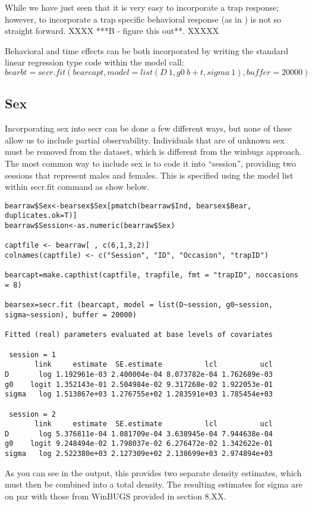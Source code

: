 While we have just seen that 
it is very easy to incorporate a trap response; however, to
incorporate a trap specific behavioral response (as in
\citet{royle_etal:2009}) is not so straight forward.  XXXX ***B - figure
this out**. XXXXX

Behavioral and time effects can be both incorporated by writing the standard linear regression type code within the model call:
\[
bearbt=secr.fit (bearcapt, model = list(D~1, g0~b + t, sigma~1), buffer = 20000)
\]

\subsection{Sex}

Incorporating sex into secr can be done a few different ways, but none
of these allow us to include partial observability.   Individuals that
are of unknown sex must be removed from the dataset, which is
different from the winbugs approach.  The most common way to include
sex is to code it into ``session'', providing two sessions that
represent males and females.  This is specified using the model list
within secr.fit command as show below.
{\small 
\begin{verbatim}
bearraw$Sex<-bearsex$Sex[pmatch(bearraw$Ind, bearsex$Bear, duplicates.ok=T)]
bearraw$Session<-as.numeric(bearraw$Sex)

captfile <- bearraw[ , c(6,1,3,2)] 
colnames(captfile) <- c("Session", "ID", "Occasion", "trapID")

bearcapt=make.capthist(captfile, trapfile, fmt = "trapID", noccasions = 8)

bearsex=secr.fit (bearcapt, model = list(D~session, g0~session, sigma~session), buffer = 20000)

Fitted (real) parameters evaluated at base levels of covariates 

 session = 1 
       link     estimate  SE.estimate          lcl          ucl
D       log 1.192961e-03 2.400004e-04 8.073782e-04 1.762689e-03
g0    logit 1.352143e-01 2.504984e-02 9.317268e-02 1.922053e-01
sigma   log 1.513867e+03 1.276755e+02 1.283591e+03 1.785454e+03

 session = 2 
       link     estimate  SE.estimate          lcl          ucl
D       log 5.376811e-04 1.081709e-04 3.638945e-04 7.944638e-04
g0    logit 9.248494e-02 1.798037e-02 6.276472e-02 1.342622e-01
sigma   log 2.522380e+03 2.127309e+02 2.138699e+03 2.974894e+03
\end{verbatim}
}
As you can see in the output, this provides two separate density
estimates, which must then be combined into a total density.  The
resulting estimates for sigma are on par with those from WinBUGS
provided in section 8.XX.


